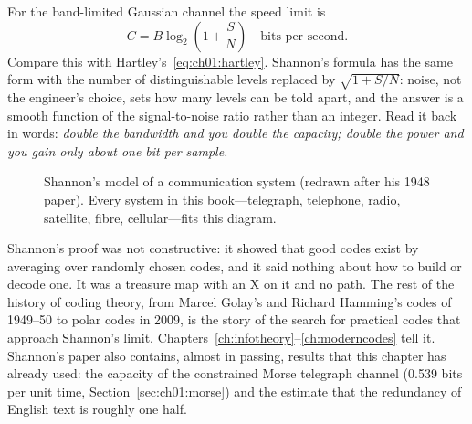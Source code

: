For the band-limited Gaussian channel the speed limit is
\begin{equation}
C = B\log_2\!\left(1 + \frac{S}{N}\right)\quad\text{bits per second.}
\label{eq:ch01:shannon}
\end{equation}
Compare this with Hartley's~\eqref{eq:ch01:hartley}. Shannon's formula has the same form with the
number of distinguishable levels replaced by $\sqrt{1+S/N}$: noise, not the engineer's choice, sets
how many levels can be told apart, and the answer is a smooth function of the signal-to-noise ratio
rather than an integer. Read it back in words: \emph{double the bandwidth and you double the
capacity; double the power and you gain only about one bit per sample.}

\begin{figure}[htbp]\centering
{}
\caption{Shannon's model of a communication system (redrawn after his 1948 paper). Every system in this
book---telegraph, telephone, radio, satellite, fibre, cellular---fits this diagram.}
\label{fig:ch01:shannon}
\end{figure}

Shannon's proof was not constructive: it showed that good codes exist by averaging over randomly chosen
codes, and it said nothing about how to build or decode one. It was a treasure map with an X on it and
no path. The rest of the history of coding theory, from Marcel Golay's and Richard Hamming's codes of
1949--50 to polar codes in 2009, is the story of the search for practical codes that approach Shannon's
limit. Chapters~\ref{ch:infotheory}--\ref{ch:moderncodes} tell it. Shannon's paper also contains,
almost in passing, results that this chapter has already used: the capacity of the constrained Morse
telegraph channel (0.539 bits per unit time, Section~\ref{sec:ch01:morse}) and the estimate that the
redundancy of English text is roughly one half.

